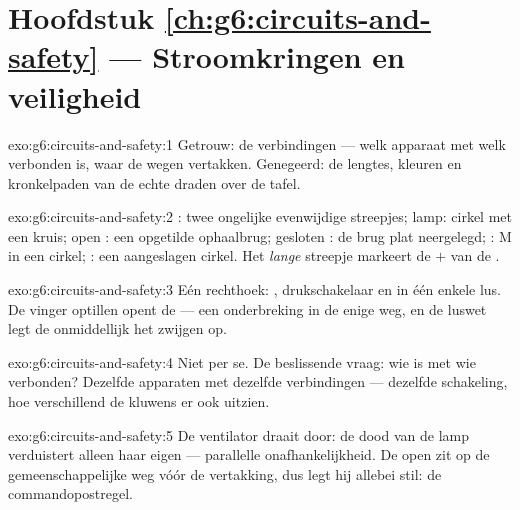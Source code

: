 \section*{Hoofdstuk \ref{ch:g6:circuits-and-safety} --- Stroomkringen en veiligheid}

\begin{solution}{exo:g6:circuits-and-safety:1}
Getrouw: de verbindingen --- welk apparaat met welk verbonden is, waar
de wegen vertakken. Genegeerd: de lengtes, kleuren en kronkelpaden van
de echte draden over de tafel.
\end{solution}

\begin{solution}{exo:g6:circuits-and-safety:2}
: twee ongelijke evenwijdige streepjes; lamp: cirkel met
een kruis; open : een opgetilde ophaalbrug; gesloten
: de brug plat neergelegd; : M in een cirkel;
: een aangeslagen cirkel. Het \emph{lange} streepje markeert de
$+$ van de .
\end{solution}

\begin{solution}{exo:g6:circuits-and-safety:3}
Eén rechthoek: , drukschakelaar en  in één enkele
lus. De vinger optillen opent de  --- een onderbreking in de
enige weg, en de luswet legt de  onmiddellijk het zwijgen op.
\end{solution}

\begin{solution}{exo:g6:circuits-and-safety:4}
Niet per se. De beslissende vraag: wie is met wie verbonden? Dezelfde
apparaten met dezelfde verbindingen --- dezelfde schakeling, hoe
verschillend de kluwens er ook uitzien.
\end{solution}

\begin{solution}{exo:g6:circuits-and-safety:5}
De ventilator draait door: de dood van de lamp verduistert alleen haar
eigen  --- parallelle onafhankelijkheid. De open
 zit op de gemeenschappelijke weg vóór de vertakking, dus
legt hij allebei stil: de commandopostregel.
\end{solution}

